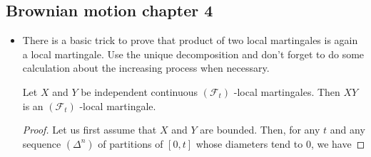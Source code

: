 \subsection{Brownian motion chapter 4}
\begin{itemize}
	\item There is a basic trick to prove that product of two local martingales is again a local martingale. Use the unique decomposition and don't forget to do some calculation about the increasing process when necessary.
	\begin{proposition}
		Let $X$ and $Y$ be independent continuous $\left(\mathcal{F}_{t}\right)$ -local martingales. Then $X Y$ is an $\left(\mathcal{F}_{t}\right)$ -local martingale. 
	\end{proposition} 
\begin{proof}
	Let us first assume that $X$ and $Y$ are bounded. Then, for any $t$ and any sequence $\left(\Delta^{n}\right)$ of partitions of $[0, t]$ whose diameters tend to $0$, we have
	

\end{proof}
\end{itemize}
